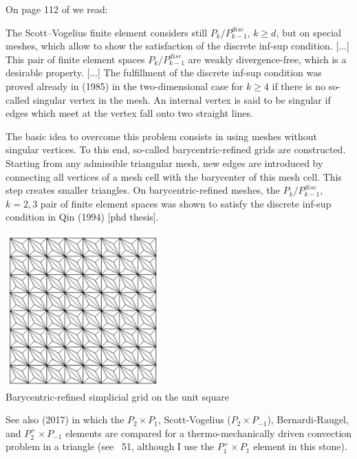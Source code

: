 On page 112 of \textcite{john16} we read:
\begin{displayquote}
{\color{darkgray}
The Scott–Vogelius finite element considers still $P_k/P^{disc}_{k-1}$, $k \ge d$, 
but on special meshes, which allow to show the satisfaction of the 
discrete inf-sup condition.
[...]
This pair of finite element spaces $P_k/P^{disc}_{k-1}$
are weakly divergence-free, which is a desirable property.
[...]
The fulfillment of the discrete inf-sup condition 
was proved already in \textcite{scvo85} (1985) in the two-dimensional 
case for $k\ge 4$ if there is no so-called singular vertex in the mesh.
An internal vertex is said to be singular if edges which meet at the vertex fall onto
two straight lines.

The basic idea to overcome this problem consists in using meshes 
without singular vertices. To this end, so-called barycentric-refined 
grids are constructed. Starting from any admissible triangular mesh, 
new edges are introduced by connecting all
vertices of a mesh cell with the barycenter of this mesh cell. 
This step creates smaller triangles.
On barycentric-refined meshes, the $P_k/P^{disc}_{k-1}$, $k=2,3$ 
pair of finite element spaces was shown to satisfy the discrete inf-sup
condition in Qin (1994) [phd thesis].
}
\end{displayquote}


\begin{center}
\includegraphics[width=6cm]{images/pair_scott_vogelius/john16}\\
{\captionfont Barycentric-refined simplicial grid on the unit square}
\end{center}


See also \textcite{jolm17} (2017) in which the $P_2\times P_1$, Scott-Vogelius ($P_2\times P_{-1}$), 
Bernardi-Raugel, and $P_2^+\times P_{-1}$ elements 
are compared for a thermo-mechanically driven convection problem in a triangle (see \stone~51, 
although I use the $P_1^+\times P_1$ element in this stone).


